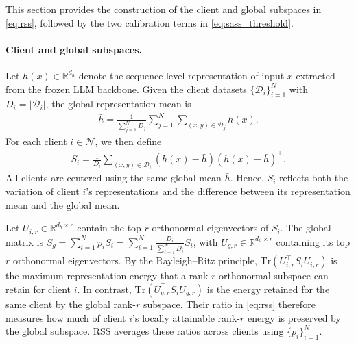 \documentclass[lettersize,journal]{IEEEtran}
\begin{document}
	This section provides the construction of the client and global subspaces in \eqref{eq:rss}, followed by the two calibration terms in \eqref{eq:sass_threshold}.
	
	\paragraph{Client and global subspaces.}
	Let $h(x)\in\mathbb{R}^{d_h}$ denote the sequence-level representation of input $x$ extracted from the frozen LLM backbone. Given the client datasets $\{\mathcal{D}_i\}_{i=1}^{N}$ with $D_i=|\mathcal{D}_i|$, the global representation mean is
	\begin{align}
		\bar{h}
		=
		\frac{1}{\sum_{j=1}^{N}D_j}
		\sum_{j=1}^{N}
		\sum_{(x,y)\in\mathcal{D}_j}
		h(x).
	\end{align}
	For each client $i\in\mathcal{N}$, we then define
	\begin{align}
		S_i
		=
		\frac{1}{D_i}
		\sum_{(x,y)\in\mathcal{D}_i}
		\left(h(x)-\bar{h}\right)
		\left(h(x)-\bar{h}\right)^{\top}.
		\label{eq:sass_client_cov}
	\end{align}
	All clients are centered using the same global mean $\bar{h}$. Hence, $S_i$ reflects both the variation of client $i$'s representations and the difference between its representation mean and the global mean.
	
	Let $U_{i,r}\in\mathbb{R}^{d_h\times r}$ contain the top $r$ orthonormal eigenvectors of $S_i$. The global matrix is $ S_g
	= \sum_{i=1}^N p_i S_i =
	\sum_{i=1}^{N} \frac{D_i}{\sum_{i=1}^N D_i} S_i$, with $U_{g,r}\in\mathbb{R}^{d_h\times r}$ containing its top $r$ orthonormal eigenvectors.
	By the Rayleigh--Ritz principle, $\mathrm{Tr}(U_{i,r}^{\top}S_iU_{i,r})$ is the maximum representation energy that a rank-$r$ orthonormal subspace can retain for client $i$. In contrast, $\mathrm{Tr}(U_{g,r}^{\top}S_iU_{g,r})$ is the energy retained for the same client by the global rank-$r$ subspace. Their ratio in \eqref{eq:rss} therefore measures how much of client $i$'s locally attainable rank-$r$ energy is preserved by the global subspace. RSS averages these ratios across clients using $\{p_i\}_{i=1}^{N}$.
	
\end{document}
